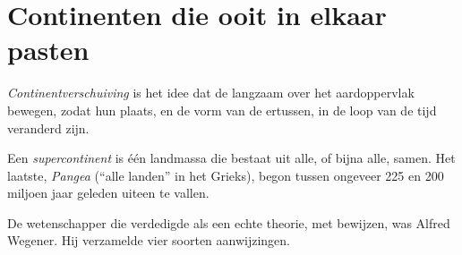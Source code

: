 \section{Continenten die ooit in elkaar pasten}

\begin{definition}[Continentverschuiving]\label{def:g7:plate-tectonics:continental-drift}
\emph{Continentverschuiving} is het idee dat
de  langzaam over het aardoppervlak bewegen, zodat hun plaats,
en de vorm van de  ertussen, in de loop van de tijd veranderd zijn.
\end{definition}

\begin{definition}[Supercontinent]\label{def:g7:plate-tectonics:supercontinent}
Een \emph{supercontinent} is één landmassa die bestaat
uit alle, of bijna alle,  samen. Het laatste,
\emph{Pangea} (``alle landen'' in het Grieks), begon tussen
ongeveer 225 en 200 miljoen jaar geleden uiteen te vallen.
\end{definition}

De wetenschapper die  verdedigde als een echte
theorie, met bewijzen, was Alfred Wegener. Hij verzamelde vier soorten
aanwijzingen.

